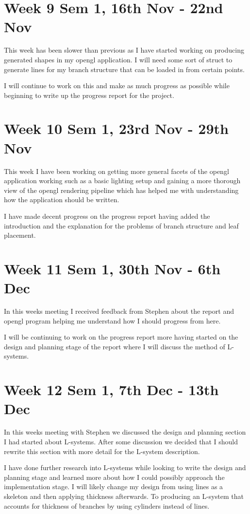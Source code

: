 \documentclass[11pt]{article}
\begin{document}
\section*{Week 9 Sem 1, 16th Nov - 22nd Nov}
This week has been slower than previous as I have started working on producing generated shapes 
in my opengl application. I will need some sort of struct to generate lines for my branch 
structure that can be loaded in from certain points. 

I will continue to work on this and make as much progress as possible while beginning to write 
up the progress report for the project.

\section*{Week 10 Sem 1, 23rd Nov - 29th Nov}
This week I have been working on getting more general facets of the opengl application working 
such as a basic lighting setup and gaining a more thorough view of the opengl rendering 
pipeline which has helped me with understanding how the application should be written.

I have made decent progress on the progress report having added the introduction and the 
explanation for the problems of branch structure and leaf placement.

\section*{Week 11 Sem 1, 30th Nov - 6th Dec}
In this weeks meeting I received feedback from Stephen about the report and opengl program 
helping me understand how I should progress from here. 

I will be continuing to work on the progress report more having started on the design and 
planning stage of the report where I will discuss the method of L-systems. 

\section*{Week 12 Sem 1, 7th Dec - 13th Dec}
In this weeks meeting with Stephen we discussed the design and planning section I had started 
about L-systems. After some discussion we decided that I should rewrite this section with more 
detail for the L-system description.

I have done further research into L-systems while looking to write the design and planning stage 
and learned more about how I could possibly approach the implementation stage. I will likely 
change my design from using lines as a skeleton and then applying thickness afterwards. To 
producing an L-system that accounts for thickness of branches by using cylinders instead of lines.
\end{document}
